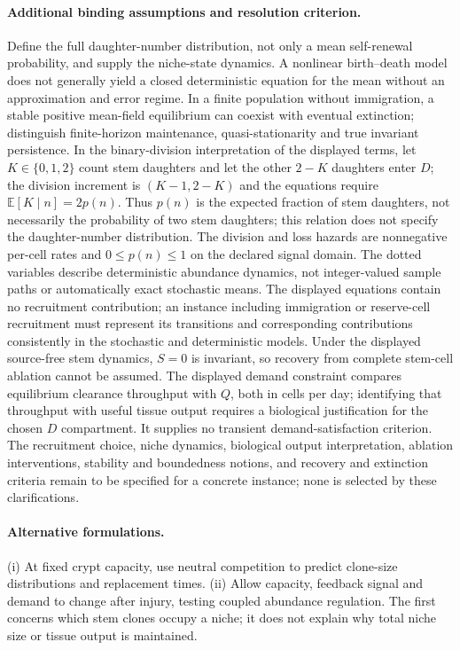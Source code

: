 \documentclass[11pt]{article}
\begin{document}
\paragraph{Additional binding assumptions and resolution criterion.} Define the full daughter-number distribution, not only a mean self-renewal probability, and supply the niche-state dynamics. A nonlinear birth--death model does not generally yield a closed deterministic equation for the mean without an approximation and error regime. In a finite population without immigration, a stable positive mean-field equilibrium can coexist with eventual extinction; distinguish finite-horizon maintenance, quasi-stationarity and true invariant persistence. In the binary-division interpretation of the displayed terms, let $K\in\{0,1,2\}$ count stem daughters and let the other $2-K$ daughters enter $D$; the division increment is $(K-1,2-K)$ and the equations require $\mathbb{E}[K\mid n]=2p(n)$. Thus $p(n)$ is the expected fraction of stem daughters, not necessarily the probability of two stem daughters; this relation does not specify the daughter-number distribution. The division and loss hazards are nonnegative per-cell rates and $0\leq p(n)\leq1$ on the declared signal domain. The dotted variables describe deterministic abundance dynamics, not integer-valued sample paths or automatically exact stochastic means. The displayed equations contain no recruitment contribution; an instance including immigration or reserve-cell recruitment must represent its transitions and corresponding contributions consistently in the stochastic and deterministic models. Under the displayed source-free stem dynamics, $S=0$ is invariant, so recovery from complete stem-cell ablation cannot be assumed. The displayed demand constraint compares equilibrium clearance throughput with $Q$, both in cells per day; identifying that throughput with useful tissue output requires a biological justification for the chosen $D$ compartment. It supplies no transient demand-satisfaction criterion. The recruitment choice, niche dynamics, biological output interpretation, ablation interventions, stability and boundedness notions, and recovery and extinction criteria remain to be specified for a concrete instance; none is selected by these clarifications.

\paragraph{Alternative formulations.} (i) At fixed crypt capacity, use neutral competition to predict clone-size distributions and replacement times. (ii) Allow capacity, feedback signal and demand to change after injury, testing coupled abundance regulation. The first concerns which stem clones occupy a niche; it does not explain why total niche size or tissue output is maintained.
\end{document}
